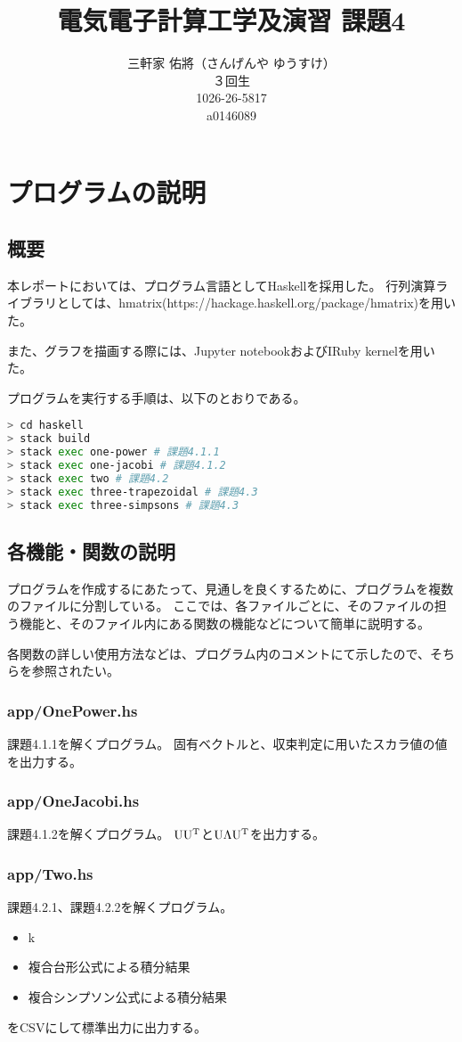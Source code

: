 \documentclass[11pt]{jsarticle}
\title{電気電子計算工学及演習 課題4}
\author{三軒家 佑將（さんげんや ゆうすけ） \\ ３回生 \\ 1026-26-5817 \\ a0146089}
\date{}
\begin{document}
\maketitle

\section{プログラムの説明}
\subsection{概要}
本レポートにおいては、プログラム言語としてHaskellを採用した。
行列演算ライブラリとしては、hmatrix(https://hackage.haskell.org/package/hmatrix)を用いた。

また、グラフを描画する際には、Jupyter notebookおよびIRuby kernelを用いた。

プログラムを実行する手順は、以下のとおりである。
\begin{lstlisting}[language=bash]
> cd haskell
> stack build
> stack exec one-power # 課題4.1.1
> stack exec one-jacobi # 課題4.1.2
> stack exec two # 課題4.2
> stack exec three-trapezoidal # 課題4.3
> stack exec three-simpsons # 課題4.3
\end{lstlisting}

\subsection{各機能・関数の説明}
プログラムを作成するにあたって、見通しを良くするために、プログラムを複数のファイルに分割している。
ここでは、各ファイルごとに、そのファイルの担う機能と、そのファイル内にある関数の機能などについて簡単に説明する。

各関数の詳しい使用方法などは、プログラム内のコメントにて示したので、そちらを参照されたい。

\subsubsection*{app/OnePower.hs}
課題4.1.1を解くプログラム。
固有ベクトルと、収束判定に用いたスカラ値の値を出力する。

\subsubsection*{app/OneJacobi.hs}
課題4.1.2を解くプログラム。
${\rm U} {\rm U}^{\rm T}$と${\rm U}\Lambda{\rm U}^{\rm T}$を出力する。

\subsubsection*{app/Two.hs}
課題4.2.1、課題4.2.2を解くプログラム。
\begin{itemize}
    \item k
    \item 複合台形公式による積分結果
    \item 複合シンプソン公式による積分結果
\end{itemize}
をCSVにして標準出力に出力する。
\end{document}
